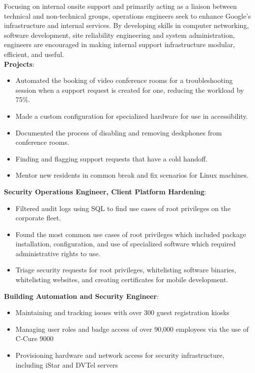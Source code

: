 \documentclass[letter,sans]{moderncv}
\begin{document}
{Focusing on internal onsite support and primarily acting as a liaison between technical and non-technical groups, operations engineers seek to enhance Google's infrastructure and internal services. By developing skills in computer networking, software development, site reliability engineering and system administration, engineers are encouraged in making internal support infrastructure modular, efficient, and useful.\\
  \textbf{Projects}:
  \begin{itemize}
    \item Automated the booking of video conference rooms for a troubleshooting session when a support request is created for one, reducing the workload by 75\%.
    \item Made a custom configuration for specialized hardware for use in accessibility.
    \item Documented the process of disabling and removing deskphones from conference rooms.
    \item Finding and flagging support requests that have a cold handoff.
    \item Mentor new residents in common break and fix scenarios for Linux machines.
  \end{itemize}
  \textbf{Security Operations Engineer, Client Platform Hardening}:
  \begin{itemize}
    \item Filtered audit logs using SQL to find use cases of root privileges on the corporate fleet.
    \item Found the most common use cases of root privileges which included package installation, configuration, and use of specialized software which required administrative rights to use.
    \item Triage security requests for root privileges, whitelisting software binaries, whitelisting websites, and creating certificates for mobile development.
  \end{itemize}
  \textbf{Building Automation and Security Engineer}:
  \begin{itemize}
    \item Maintaining and tracking issues with over 300 guest registration kiosks
    \item Managing user roles and badge access of over 90,000 employees via the use of C-Cure 9000
    \item Provisioning hardware and network access for security infrastructure, including iStar and DVTel servers
  \end{itemize}
}
\end{document}
